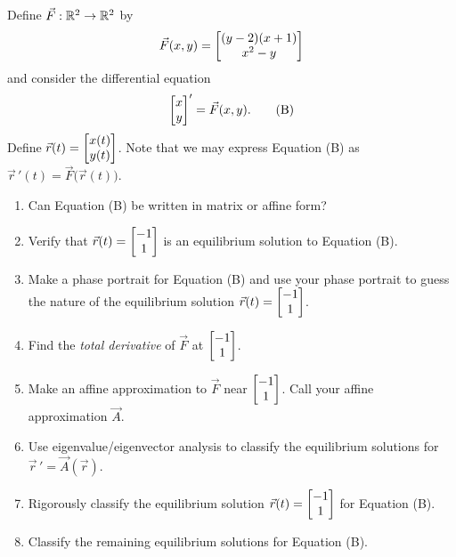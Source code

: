 \begin{enumerate}
	      Define $\vec F:\mathbb{R}^2\to\mathbb{R}^2$ by
	      \[
		      \vec F(x,y) = \begin{bmatrix}(y-2)(x+1)\\x^2-y\end{bmatrix}
	      \]
	      and consider the differential equation
	      \begin{equation}
		      \begin{bmatrix}x\\y\end{bmatrix}' = \vec F(x,y).\tag{B}
	      \end{equation}
	      Define $\vec r(t) = \begin{bmatrix}x(t)\\y(t)\end{bmatrix}$. Note that we may express Equation (B) as $\vec r\,'(t) = \vec F\Big(\vec r(t)\Big)$.
	      \begin{enumerate}
		      \item Can Equation (B) be written in matrix or affine form?
		      \item Verify that $\vec r(t) = \begin{bmatrix}-1\\1\end{bmatrix}$ is an equilibrium solution to Equation (B).
		      \item Make a phase portrait for Equation (B) and use your phase portrait to guess the nature
		            of the equilibrium solution $\vec r(t) = \begin{bmatrix}-1\\1\end{bmatrix}$.
		      \item Find the \emph{total derivative} of $\vec F$ at $\begin{bmatrix}-1\\1\end{bmatrix}$.
			  \item Make an affine approximation to $\vec F$ near $\begin{bmatrix}-1\\1\end{bmatrix}$. Call your affine approximation $\vec A$.
			  \item Use eigenvalue/eigenvector analysis to classify the equilibrium solutions for $\vec r\,' = \vec A(\vec r)$.
			  \item Rigorously classify the equilibrium solution $\vec r(t)=\begin{bmatrix}-1\\1\end{bmatrix}$ for Equation (B).
			  \item Classify the remaining equilibrium solutions for Equation (B).
		      
	      \end{enumerate}
\end{enumerate}
